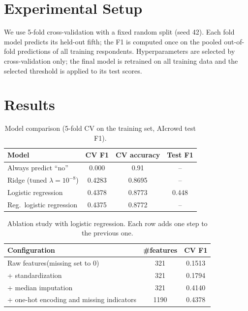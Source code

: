 \documentclass[10pt,conference]{IEEEtran}
\begin{document}
\section{Experimental Setup}
We use 5-fold cross-validation with a fixed random split (seed 42). Each fold
model predicts its held-out fifth; the F1 is computed once on the pooled
out-of-fold predictions of all training respondents. Hyperparameters are selected by cross-validation only; the final model is
retrained on all training data and the selected threshold is applied to its
test scores.

\section{Results}

\begin{table}[t]
  \centering
  \caption{Model comparison (5-fold CV on the training set, AIcrowd test F1).}
  \label{tab:models}
  \begin{tabular}{lccc}
    \toprule
    Model & CV F1 & CV accuracy & Test F1 \\
    \midrule
    Always predict ``no'' & 0.000 & 0.91 & -- \\
    Ridge (tuned $\lambda=10^{-8}$)  & 0.4283 & 0.8695 & -- \\
    Logistic regression & 0.4378 & 0.8773 & 0.448 \\
    Reg.\ logistic regression & 0.4375 & 0.8772 & -- \\
    \bottomrule
  \end{tabular}
\end{table}

\begin{table}[t]
  \centering
  \caption{Ablation study with logistic regression. Each row adds one step to
  the previous one.}
  \label{tab:ablation}
  \begin{tabular}{lcc}
    \toprule
    Configuration & \#features & CV F1 \\
    \midrule
    Raw features(missing set to 0)  & 321 & 0.1513 \\
    + standardization & 321 & 0.1794 \\
    + median imputation  & 321 & 0.4140 \\
    + one-hot encoding and missing indicators & 1190 & 0.4378 \\
    
    \bottomrule
  \end{tabular}
\end{table}
\end{document}
